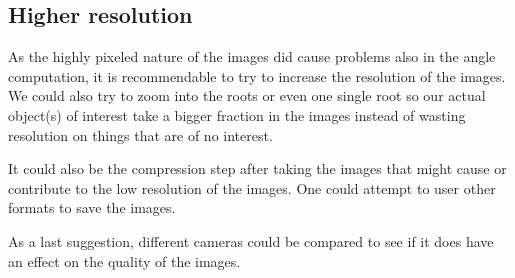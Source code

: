 \subsection{Higher resolution}


As the highly pixeled nature of the images did cause problems also in the angle computation, it is recommendable to try to increase the resolution of the images. We could also try to zoom into the roots or even one single root so our actual object(s) of interest take a bigger fraction in the images instead of wasting resolution on things that are of no interest. 

It could also be the compression step after taking the images that might cause or contribute to the low resolution of the images. One could attempt to user other formats to save the images. 

As a last suggestion, different cameras could be compared to see if it does have an effect on the quality of the images. 




